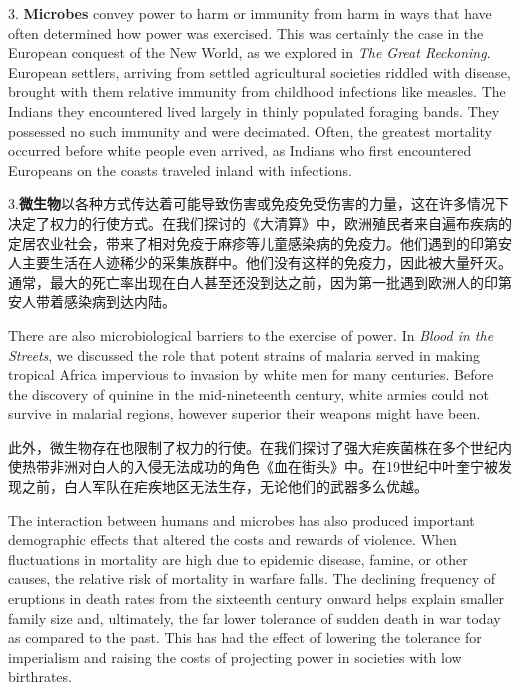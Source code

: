 \begin{Parallel}{97mm}{45mm}
  \ParallelLText
  {3. \textbf{Microbes} convey power to harm or immunity from harm in ways that have often determined how power was exercised. This was certainly the case in the European conquest of the New World, as we explored in \emph{The Great Reckoning}. European settlers, arriving from settled agricultural societies riddled with disease, brought with them relative immunity from childhood infections like measles. The Indians they encountered lived largely in thinly populated foraging bands. They possessed no such immunity and were decimated. Often, the greatest mortality occurred before white people even arrived, as Indians who first encountered Europeans on the coasts traveled inland with infections.}
  
  \ParallelRText
  {3.\textbf{微生物}以各种方式传达着可能导致伤害或免疫免受伤害的力量，这在许多情况下决定了权力的行使方式。在我们探讨的《大清算》中，欧洲殖民者来自遍布疾病的定居农业社会，带来了相对免疫于麻疹等儿童感染病的免疫力。他们遇到的印第安人主要生活在人迹稀少的采集族群中。他们没有这样的免疫力，因此被大量歼灭。通常，最大的死亡率出现在白人甚至还没到达之前，因为第一批遇到欧洲人的印第安人带着感染病到达内陆。}
  \ParallelPar



  \ParallelLText
  {There are also microbiological barriers to the exercise of power. In \emph{Blood in the Streets}, we discussed the role that potent strains of malaria served in making tropical Africa impervious to invasion by white men for many centuries. Before the discovery of quinine in the mid-nineteenth century, white armies could not survive in malarial regions, however superior their weapons might have been.}
  
  \ParallelRText
  {此外，微生物存在也限制了权力的行使。在我们探讨了强大疟疾菌株在多个世纪内使热带非洲对白人的入侵无法成功的角色《血在街头》中。在19世纪中叶奎宁被发现之前，白人军队在疟疾地区无法生存，无论他们的武器多么优越。}
  \ParallelPar



  \ParallelLText
  {The interaction between humans and microbes has also produced important demographic effects that altered the costs and rewards of violence. When fluctuations in mortality are high due to epidemic disease, famine, or other causes, the relative risk of mortality in warfare falls. The declining frequency of eruptions in death rates from the sixteenth century onward helps explain smaller family size and, ultimately, the far lower tolerance of sudden death in war today as compared to the past. This has had the effect of lowering the tolerance for imperialism and raising the costs of projecting power in societies with low birthrates.}
  

\end{Parallel}
